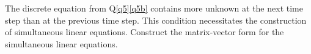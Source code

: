 
	
	\item The discrete equation from Q\ref{q5}\ref{q5b} contains more unknown at the next time step than at the previous time step. This condition necessitates the construction of simultaneous linear equations. Construct the matrix-vector form for the simultaneous linear equations.  
	




\listclose	%
